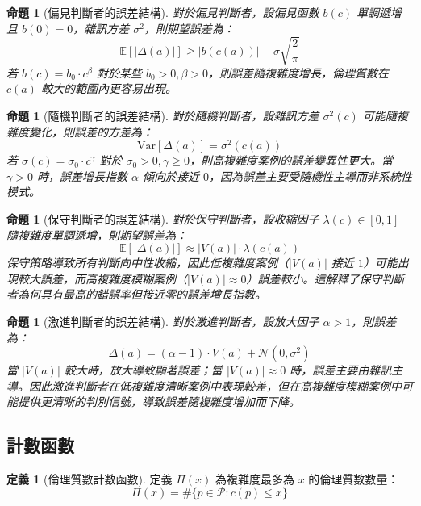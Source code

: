\documentclass[12pt,a4paper]{article}
\newtheorem{proposition}[theorem]{命題}
\theoremstyle{definition}
\newtheorem{definition}[theorem]{定義}
\theoremstyle{remark}
\begin{document}
\begin{proposition}[偏見判斷者的誤差結構]
\label{prop:biased_error}
對於偏見判斷者，設偏見函數 $b(c)$ 單調遞增且 $b(0) = 0$，雜訊方差 $\sigma^2$，則期望誤差為：
\[
\mathbb{E}[|\Delta(a)|] \geq |b(c(a))| - \sigma \sqrt{\frac{2}{\pi}}
\]
若 $b(c) = b_0 \cdot c^\beta$ 對於某些 $b_0 > 0, \beta > 0$，則誤差隨複雜度增長，倫理質數在 $c(a)$ 較大的範圍內更容易出現。
\end{proposition}

\begin{proposition}[隨機判斷者的誤差結構]
\label{prop:noisy_error}
對於隨機判斷者，設雜訊方差 $\sigma^2(c)$ 可能隨複雜度變化，則誤差的方差為：
\[
\text{Var}[\Delta(a)] = \sigma^2(c(a))
\]
若 $\sigma(c) = \sigma_0 \cdot c^\gamma$ 對於 $\sigma_0 > 0, \gamma \geq 0$，則高複雜度案例的誤差變異性更大。當 $\gamma > 0$ 時，誤差增長指數 $\alpha$ 傾向於接近 $0$，因為誤差主要受隨機性主導而非系統性模式。
\end{proposition}

\begin{proposition}[保守判斷者的誤差結構]
\label{prop:conservative_error}
對於保守判斷者，設收縮因子 $\lambda(c) \in [0,1]$ 隨複雜度單調遞增，則期望誤差為：
\[
\mathbb{E}[|\Delta(a)|] \approx |V(a)| \cdot \lambda(c(a))
\]
保守策略導致所有判斷向中性收縮，因此低複雜度案例（$|V(a)|$ 接近 $1$）可能出現較大誤差，而高複雜度模糊案例（$|V(a)| \approx 0$）誤差較小。這解釋了保守判斷者為何具有最高的錯誤率但接近零的誤差增長指數。
\end{proposition}

\begin{proposition}[激進判斷者的誤差結構]
\label{prop:radical_error}
對於激進判斷者，設放大因子 $\alpha > 1$，則誤差為：
\[
\Delta(a) = (\alpha - 1) \cdot V(a) + \mathcal{N}(0, \sigma^2)
\]
當 $|V(a)|$ 較大時，放大導致顯著誤差；當 $|V(a)| \approx 0$ 時，誤差主要由雜訊主導。因此激進判斷者在低複雜度清晰案例中表現較差，但在高複雜度模糊案例中可能提供更清晰的判別信號，導致誤差隨複雜度增加而下降。
\end{proposition}

\subsection{計數函數}

\begin{definition}[倫理質數計數函數]
定義 $\Pi(x)$ 為複雜度最多為 $x$ 的倫理質數數量：
\[
\Pi(x) = \#\{p \in \mathcal{P} : c(p) \leq x\}
\]
\end{definition}
\end{document}

